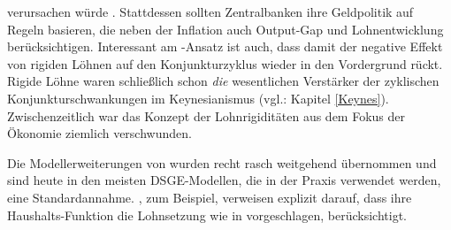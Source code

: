 verursachen würde \parencite[S. 283]{Erceg2000}. Stattdessen sollten Zentralbanken ihre Geldpolitik auf Regeln basieren, die neben der Inflation auch Output-Gap und Lohnentwicklung berücksichtigen.
Interessant am \textcite{Erceg2000}-Ansatz ist auch, dass damit der negative Effekt von rigiden Löhnen auf den Konjunkturzyklus wieder in den Vordergrund rückt. Rigide Löhne waren schließlich schon \textit{die} wesentlichen Verstärker der zyklischen Konjunkturschwankungen im Keynesianismus (vgl.: Kapitel \ref{Keynes}). Zwischenzeitlich war das Konzept der Lohnrigiditäten aus dem Fokus der Ökonomie ziemlich verschwunden.

Die Modellerweiterungen von \textcite{Erceg2000} wurden recht rasch weitgehend übernommen und sind heute in den meisten DSGE-Modellen, die in der Praxis verwendet werden, eine Standardannahme. \textcite[S. 13]{Christiano2005}, zum Beispiel, verweisen explizit darauf, dass ihre Haushalts-Funktion die Lohnsetzung wie in \textcite{Erceg2000} vorgeschlagen, berücksichtigt.

